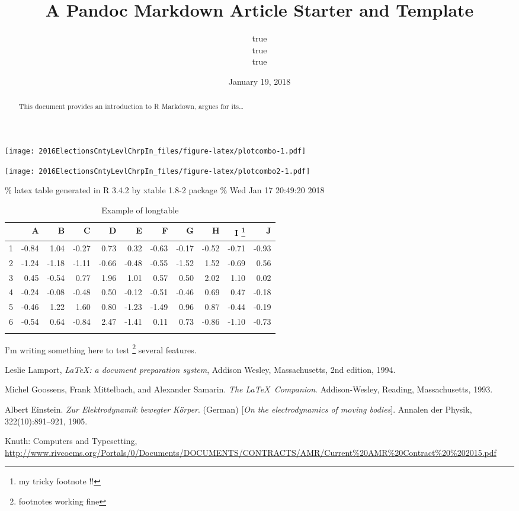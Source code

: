 \documentclass[11pt,]{article}
\title{A Pandoc Markdown Article Starter and Template}
\author{true \\ true \\ true}
\date{January 19, 2018}
\let\rmarkdownfootnote\footnote%
\def\footnote{\protect\rmarkdownfootnote}
\begin{document}
\maketitle
\begin{abstract}
This document provides an introduction to R Markdown, argues for
its\ldots{}
\end{abstract}

\texttt{[image: 2016ElectionsCntyLevlChrpIn\_files/figure-latex/plotcombo-1.pdf]}

\texttt{[image: 2016ElectionsCntyLevlChrpIn\_files/figure-latex/plotcombo2-1.pdf]}

\% latex table generated in R 3.4.2 by xtable 1.8-2 package \% Wed Jan
17 20:49:20 2018

\begin{longtable}{rrrrrrrrrrr}
  \hline
 & A & B & C & D & E & F & G & H & I \footnote{my tricky footnote !!} & J \\ 
  \hline
1 & -0.84 & 1.04 & -0.27 & 0.73 & 0.32 & -0.63 & -0.17 & -0.52 & -0.71 & -0.93 \\ 
  2 & -1.24 & -1.18 & -1.11 & -0.66 & -0.48 & -0.55 & -1.52 & 1.52 & -0.69 & 0.56 \\ 
  3 & 0.45 & -0.54 & 0.77 & 1.96 & 1.01 & 0.57 & 0.50 & 2.02 & 1.10 & 0.02 \\ 
  4 & -0.24 & -0.08 & -0.48 & 0.50 & -0.12 & -0.51 & -0.46 & 0.69 & 0.47 & -0.18 \\ 
  5 & -0.46 & 1.22 & 1.60 & 0.80 & -1.23 & -1.49 & 0.96 & 0.87 & -0.44 & -0.19 \\ 
  6 & -0.54 & 0.64 & -0.84 & 2.47 & -1.41 & 0.11 & 0.73 & -0.86 & -1.10 & -0.73 \\ 
   \hline
\hline
\caption{Example of longtable} 
\label{tabbig}
\end{longtable}

I'm writing something here to test \footnote{footnotes working fine}
several features.

\begin{thebibliography}{9}

  Leslie Lamport,
  \textit{\LaTeX: a document preparation system},
  Addison Wesley, Massachusetts,
  2nd edition,
  1994.

Michel Goossens, Frank Mittelbach, and Alexander Samarin. 
\textit{The \LaTeX\ Companion}. 
Addison-Wesley, Reading, Massachusetts, 1993.
 
Albert Einstein. 
\textit{Zur Elektrodynamik bewegter K{\"o}rper}. (German) 
[\textit{On the electrodynamics of moving bodies}]. 
Annalen der Physik, 322(10):891–921, 1905.
 
Knuth: Computers and Typesetting,
\url{http://www.rivcoems.org/Portals/0/Documents/DOCUMENTS/CONTRACTS/AMR/Current%20AMR%20Contract%20%202015.pdf}


\end{thebibliography}
\end{document}
